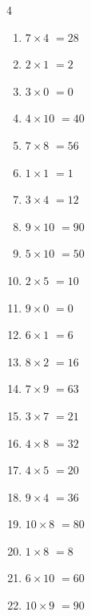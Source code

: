 \begin{multicols}{4}
\begin{enumerate}
  \item $7\times 4$
        $=28$

  \item $2\times 1$
        $=2$

  \item $3\times 0$
        $=0$

\columnbreak %

\resetques

  \item $4\times 10$
        $=40$

  \item $7\times 8$
        $=56$

  \item $1\times 1$
        $=1$

  \item $3\times 4$
        $=12$

  \item $9\times 10$
        $=90$

  \item $5\times 10$
        $=50$

  \item $2\times 5$
        $=10$

  \item $9\times 0$
        $=0$

  \item $6\times 1$
        $=6$

  \item $8\times 2$
        $=16$

  \item $7\times 9$
        $=63$

  \item $3\times 7$
        $=21$

  \item $4\times 8$
        $=32$

  \item $4\times 5$
        $=20$

  \item $9\times 4$
        $=36$

  \item $10\times 8$
        $=80$

  \item $1\times 8$
        $=8$

  \item $6\times 10$
        $=60$

  \item $10\times 9$
        $=90$


\end{enumerate}
\end{multicols}
